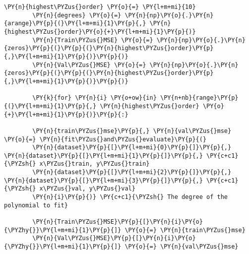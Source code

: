 \documentclass[a4paper,11pt]{article}%
\begin{document}
\begin{tcolorbox}[breakable, size=fbox, boxrule=1pt, pad at break*=1mm,colback=cellbackground, colframe=cellborder]
	\begin{Verbatim}[commandchars=\\\{\}]
		\PY{n}{highest\PYZus{}order} \PY{o}{=} \PY{l+m+mi}{10}
		\PY{n}{degrees} \PY{o}{=} \PY{n}{np}\PY{o}{.}\PY{n}{arange}\PY{p}{(}\PY{l+m+mi}{1}\PY{p}{,} \PY{n}{highest\PYZus{}order}\PY{o}{+}\PY{l+m+mi}{1}\PY{p}{)}
		\PY{n}{Train\PYZus{}MSE} \PY{o}{=} \PY{n}{np}\PY{o}{.}\PY{n}{zeros}\PY{p}{(}\PY{p}{(}\PY{n}{highest\PYZus{}order}\PY{p}{,}\PY{l+m+mi}{1}\PY{p}{)}\PY{p}{)}
		\PY{n}{Val\PYZus{}MSE} \PY{o}{=} \PY{n}{np}\PY{o}{.}\PY{n}{zeros}\PY{p}{(}\PY{p}{(}\PY{n}{highest\PYZus{}order}\PY{p}{,}\PY{l+m+mi}{1}\PY{p}{)}\PY{p}{)}
		
		\PY{k}{for} \PY{n}{i} \PY{o+ow}{in} \PY{n+nb}{range}\PY{p}{(}\PY{l+m+mi}{1}\PY{p}{,} \PY{n}{highest\PYZus{}order} \PY{o}{+}\PY{l+m+mi}{1}\PY{p}{)}\PY{p}{:}
		
		\PY{n}{train\PYZus{}mse}\PY{p}{,} \PY{n}{val\PYZus{}mse} \PY{o}{=} \PY{n}{fit\PYZus{}and\PYZus{}evaluate}\PY{p}{(}
		\PY{n}{dataset}\PY{p}{[}\PY{l+m+mi}{0}\PY{p}{]}\PY{p}{,} \PY{n}{dataset}\PY{p}{[}\PY{l+m+mi}{1}\PY{p}{]}\PY{p}{,} \PY{c+c1}{\PYZsh{} x\PYZus{}train, y\PYZus{}train}
		\PY{n}{dataset}\PY{p}{[}\PY{l+m+mi}{2}\PY{p}{]}\PY{p}{,} \PY{n}{dataset}\PY{p}{[}\PY{l+m+mi}{3}\PY{p}{]}\PY{p}{,} \PY{c+c1}{\PYZsh{} x\PYZus{}val, y\PYZus{}val}
		\PY{n}{i}\PY{p}{)} \PY{c+c1}{\PYZsh{} The degree of the polynomial to fit}
		
		\PY{n}{Train\PYZus{}MSE}\PY{p}{[}\PY{n}{i}\PY{o}{\PYZhy{}}\PY{l+m+mi}{1}\PY{p}{]} \PY{o}{=} \PY{n}{train\PYZus{}mse}
		\PY{n}{Val\PYZus{}MSE}\PY{p}{[}\PY{n}{i}\PY{o}{\PYZhy{}}\PY{l+m+mi}{1}\PY{p}{]} \PY{o}{=} \PY{n}{val\PYZus{}mse}
		

\end{Verbatim}
\end{tcolorbox}
\end{document}
